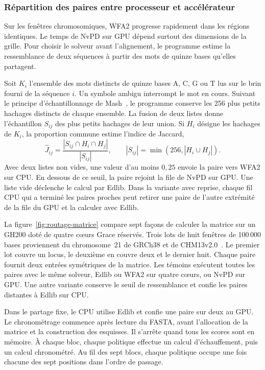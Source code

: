 \subsubsection{Répartition des paires entre processeur et accélérateur}\label{sec:routage-matrice}
Sur les fenêtres chromosomiques, WFA2 progresse rapidement dans les régions identiques. Le temps de NvPD sur GPU dépend surtout des dimensions de la grille. Pour choisir le solveur avant l’alignement, le programme estime la ressemblance de deux séquences à partir des mots de quinze bases qu’elles partagent.

Soit \(K_i\) l’ensemble des mots distincts de quinze bases A, C, G ou T lus sur le brin fourni de la séquence \(i\). Un symbole ambigu interrompt le mot en cours. Suivant le principe d’échantillonnage de Mash~\cite{mash}, le programme conserve les 256 plus petits hachages distincts de chaque ensemble. La fusion de deux listes donne l’échantillon \(S_{ij}\) des plus petits hachages de leur union. Si \(H_i\) désigne les hachages de \(K_i\), la proportion commune estime l’indice de Jaccard,
\[
  \widehat J_{ij}=\frac{|S_{ij}\cap H_i\cap H_j|}{|S_{ij}|},
  \qquad |S_{ij}|=\min(256,|H_i\cup H_j|).
\]
Avec deux listes non vides, une valeur d’au moins \(0{,}25\) envoie la paire vers WFA2 sur CPU. En dessous de ce seuil, la paire rejoint la file de NvPD sur GPU. Une liste vide déclenche le calcul par Edlib. Dans la variante avec reprise, chaque fil CPU qui a terminé les paires proches peut retirer une paire de l’autre extrémité de la file du GPU et la calculer avec Edlib.

La figure~\ref{fig:routage-matrice} compare sept façons de calculer la matrice sur un GH200 doté de quatre cœurs Grace réservés. Trois lots de huit fenêtres de 100\,000 bases proviennent du chromosome~21 de GRCh38 et de CHM13v2.0~\cite{grch38,t2t,ucscchain}. Le premier lot couvre un locus, le deuxième en couvre deux et le dernier huit. Chaque paire fournit deux entrées symétriques de la matrice. Les témoins exécutent toutes les paires avec le même solveur, Edlib ou WFA2 sur quatre cœurs, ou NvPD sur GPU. Une autre variante conserve le seuil de ressemblance et confie les paires distantes à Edlib sur CPU.

Dans le partage fixe, le CPU utilise Edlib et confie une paire sur deux au GPU. Le chronométrage commence après lecture du FASTA, avant l’allocation de la matrice et la construction des esquisses. Il s’arrête quand tous les scores sont en mémoire. À chaque bloc, chaque politique effectue un calcul d’échauffement, puis un calcul chronométré. Au fil des sept blocs, chaque politique occupe une fois chacune des sept positions dans l’ordre de passage.

